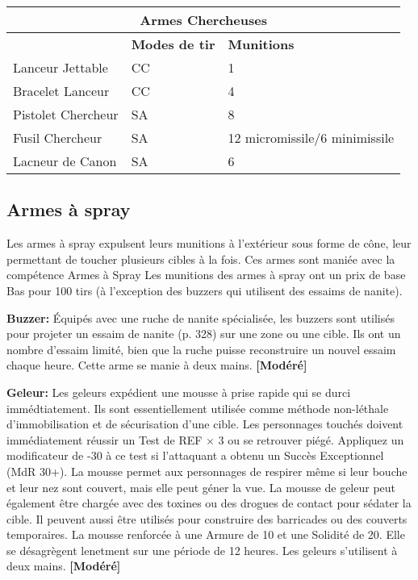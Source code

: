 \begin{table} \begin{tabular}{|l|l|l|} \hline

\multicolumn{3}{|c|}{\textbf{Armes Chercheuses}} \\ \hline

&\textbf{Modes de tir}	&\textbf{Munitions} \\ \hline

Lanceur Jettable	&CC	&1 \\ \hline

Bracelet Lanceur	&CC	&4 \\ \hline

Pistolet Chercheur	&SA	&8 \\ \hline

Fusil Chercheur	&SA	&12 micromissile/6 minimissile \\ \hline

Lacneur de Canon	&SA	&6 \\ \hline

\end{tabular} \label{tab:seeker-weapons} \end{table} 



\subsection{Armes à spray} \label{sec:spray-weapons} 

Les armes à spray expulsent leurs munitions à l'extérieur sous forme de cône, leur permettant de toucher plusieurs cibles à la fois. Ces armes sont maniée avec la compétence Armes à Spray Les munitions des armes à spray ont un prix de base Bas pour 100 tirs (à l'exception des buzzers qui utilisent des essaims de nanite). 

\textbf{Buzzer:} Équipés avec une ruche de nanite spécialisée, les buzzers sont utilisés pour projeter un essaim de nanite (p. 328) sur une zone ou une cible. Ils ont un nombre d'essaim limité, bien que la ruche puisse reconstruire un nouvel essaim chaque heure. Cette arme se manie à deux mains. \textbf{[Modéré]} 

\textbf{Geleur:} Les geleurs expédient une mousse à prise rapide qui se durci immédtiatement. Ils sont essentiellement utilisée comme méthode non-léthale d'immobilisation et de sécurisation d'une cible. Les personnages touchés doivent immédiatement réussir un Test  de REF $\times$ 3 ou se retrouver piégé. Appliquez un modificateur de -30 à ce test si l'attaquant a obtenu un Succès Exceptionnel (MdR 30+). La mousse permet aux personnages de respirer même si leur bouche et leur nez sont couvert, mais elle peut géner la vue. La mousse de geleur peut également être chargée avec des toxines ou des drogues de contact pour sédater la cible. Il peuvent aussi être utilisés pour construire des barricades ou des couverts temporaires. La mousse renforcée à une Armure de 10 et une Solidité de 20. Elle se désagrègent lenetment sur une période de 12 heures. Les geleurs s'utilisent à deux mains. \textbf{[Modéré]} 

